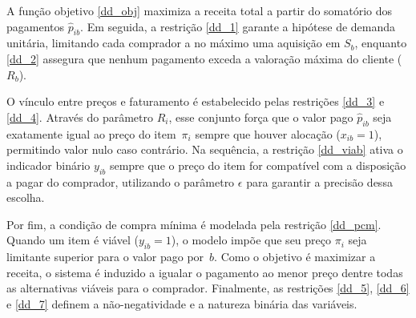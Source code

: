 A função objetivo \eqref{dd_obj} maximiza a receita total a partir do somatório dos pagamentos $\hat{p}_{ib}$. Em seguida, a restrição \eqref{dd_1} garante a hipótese de demanda unitária, limitando cada comprador a no máximo uma aquisição em $S_b$, enquanto \eqref{dd_2} assegura que nenhum pagamento exceda a valoração máxima do cliente ($R_b$).

O vínculo entre preços e faturamento é estabelecido pelas restrições \eqref{dd_3} e \eqref{dd_4}. Através do parâmetro $R_i$, esse conjunto força que o valor pago $\hat{p}_{ib}$ seja exatamente igual ao preço do item~$\pi_i$ sempre que houver alocação ($x_{ib} = 1$), permitindo valor nulo caso contrário. Na sequência, a restrição \eqref{dd_viab} ativa o indicador binário $y_{ib}$ sempre que o preço do item for compatível com a disposição a pagar do comprador, utilizando o parâmetro $\epsilon$ para garantir a precisão dessa escolha.

Por fim, a condição de compra mínima é modelada pela restrição \eqref{dd_pcm}. Quando um item é viável ($y_{ib} = 1$), o modelo impõe que seu preço $\pi_i$ seja limitante superior para o valor pago por~$b$. Como o objetivo é maximizar a receita, o sistema é induzido a igualar o pagamento ao menor preço dentre todas as alternativas viáveis para o comprador. Finalmente, as restrições \eqref{dd_5}, \eqref{dd_6} e \eqref{dd_7} definem a não-negatividade e a natureza binária das variáveis.




